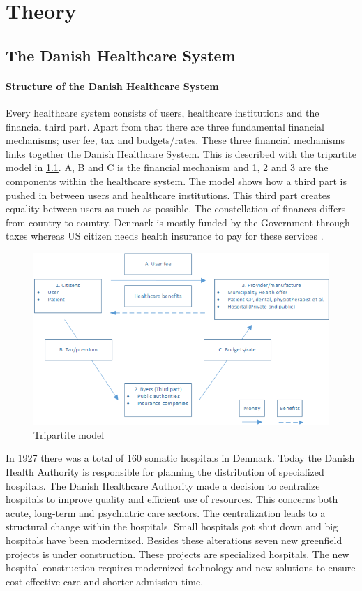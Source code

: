 \chapter{Theory}

\section{The Danish Healthcare System} \label{DHS}
\subsubsection{Structure of the Danish Healthcare System}
Every healthcare system consists of users, healthcare institutions and the financial third part. Apart from that there are three fundamental financial mechanisms; user fee, tax and budgets/rates. These three financial mechanisms links together the Danish Healthcare System. This is described with the tripartite model in \cref{Trepartmodel}. A, B and C is the financial mechanism and 1, 2 and 3 are the components within the healthcare system. The model shows how a third part is pushed in between users and healthcare institutions. This third part creates equality between users as much as possible. The constellation of finances differs from country to country. Denmark is mostly funded by the Government through taxes whereas US citizen needs health insurance to pay for these services \cite{sundhedsvaesen}. 


\begin{figure}[H]
\centering
\includegraphics[width=1\textwidth]{Figure/thirdpart.png}
\caption{Tripartite model \cite{sundhedsvaesen}}
\label{Trepartmodel}
\end{figure} 

In 1927 there was a total of 160 somatic hospitals in Denmark. Today the Danish Health Authority is responsible for planning the distribution of specialized hospitals. The Danish Healthcare Authority made a decision to centralize hospitals to improve quality and efficient use of resources. This concerns both acute, long-term and psychiatric care sectors.
The centralization leads to a structural change within the hospitals. Small hospitals got shut down and big hospitals have been modernized. Besides these alterations seven new greenfield projects is under construction. These projects are specialized hospitals. The new hospital construction requires modernized technology and new solutions to ensure cost effective care and shorter admission time. 


